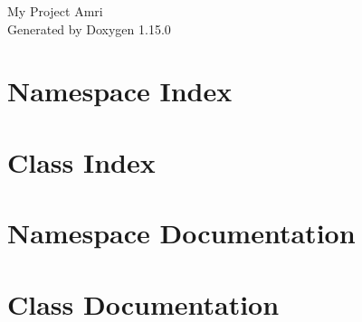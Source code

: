 \documentclass[twoside]{book}
\newcommand{\+}{\discretionary{\mbox{\scriptsize$\hookleftarrow$}}{}{}}
\newcommand{\clearemptydoublepage}{%
    \newpage{\pagestyle{empty}\cleardoublepage}%
  }
\begin{document}
  \raggedbottom
    \hypersetup{pageanchor=false,
                bookmarksnumbered=true,
                pdfencoding=unicode
               }
  \begin{titlepage}
  \vspace*{7cm}
  \begin{center}%
  {\Large My Project Amri}\\
  \vspace*{1cm}
  {\large Generated by Doxygen 1.15.0}\\
  \end{center}
  \end{titlepage}
  \clearemptydoublepage
  \tableofcontents
  \clearemptydoublepage
  \hypersetup{pageanchor=true}
\chapter{Namespace Index}

\chapter{Class Index}

\chapter{Namespace Documentation}

\chapter{Class Documentation}

  \backmatter
  \newpage
  \clearemptydoublepage
  \printindex
\end{document}
